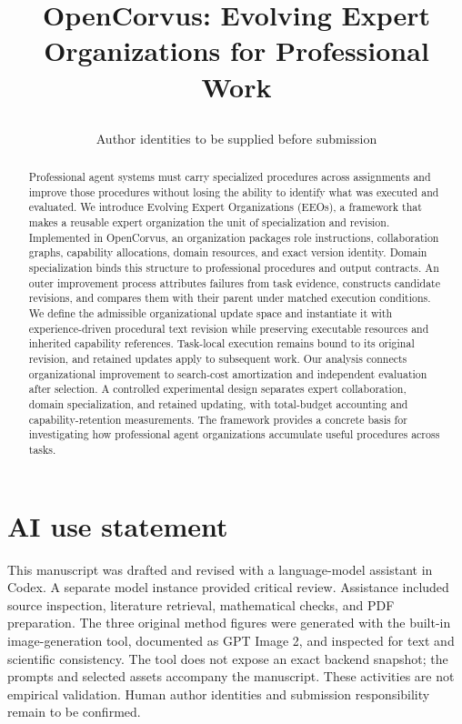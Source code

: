 \documentclass{article}
\title{\raggedright OpenCorvus: Evolving Expert Organizations for Professional Work}
\author{Author identities to be supplied before submission}
\begin{document}
\maketitle
{}
\begin{abstract}
Professional agent systems must carry specialized procedures across assignments and improve those procedures without losing the ability to identify what was executed and evaluated. We introduce Evolving Expert Organizations (EEOs), a framework that makes a reusable expert organization the unit of specialization and revision. Implemented in OpenCorvus, an organization packages role instructions, collaboration graphs, capability allocations, domain resources, and exact version identity. Domain specialization binds this structure to professional procedures and output contracts. An outer improvement process attributes failures from task evidence, constructs candidate revisions, and compares them with their parent under matched execution conditions. We define the admissible organizational update space and instantiate it with experience-driven procedural text revision while preserving executable resources and inherited capability references. Task-local execution remains bound to its original revision, and retained updates apply to subsequent work. Our analysis connects organizational improvement to search-cost amortization and independent evaluation after selection. A controlled experimental design separates expert collaboration, domain specialization, and retained updating, with total-budget accounting and capability-retention measurements. The framework provides a concrete basis for investigating how professional agent organizations accumulate useful procedures across tasks.
\end{abstract}






\section*{AI use statement}
This manuscript was drafted and revised with a language-model assistant in Codex. A separate model instance provided critical review. Assistance included source inspection, literature retrieval, mathematical checks, and PDF preparation. The three original method figures were generated with the built-in image-generation tool, documented as GPT Image 2, and inspected for text and scientific consistency. The tool does not expose an exact backend snapshot; the prompts and selected assets accompany the manuscript. These activities are not empirical validation. Human author identities and submission responsibility remain to be confirmed.

\begingroup\raggedright

\endgroup
\appendix
\clearpage

\end{document}
